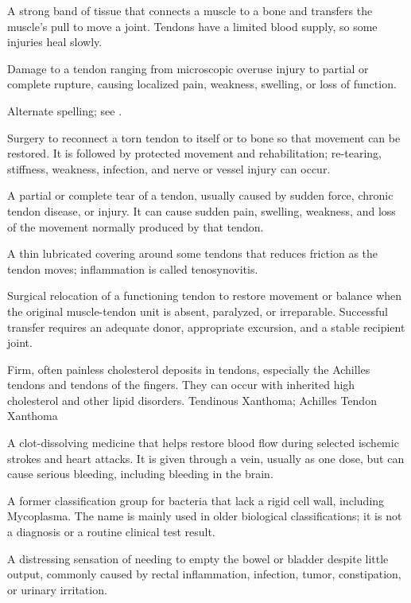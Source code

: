  A strong band of tissue that connects a muscle to a bone and transfers the muscle’s pull to move a joint. Tendons have a limited blood supply, so some injuries heal slowly.

 Damage to a tendon ranging from microscopic overuse injury to partial or complete rupture, causing localized pain, weakness, swelling, or loss of function.

 Alternate spelling; see .

 Surgery to reconnect a torn tendon to itself or to bone so that movement can be restored. It is followed by protected movement and rehabilitation; re-tearing, stiffness, weakness, infection, and nerve or vessel injury can occur.

 A partial or complete tear of a tendon, usually caused by sudden force, chronic tendon disease, or injury. It can cause sudden pain, swelling, weakness, and loss of the movement normally produced by that tendon.

 A thin lubricated covering around some tendons that reduces friction as the tendon moves; inflammation is called tenosynovitis.

 Surgical relocation of a functioning tendon to restore movement or balance when the
original muscle-tendon unit is absent, paralyzed, or irreparable. Successful transfer
requires an adequate donor, appropriate excursion, and a stable recipient joint.

 Firm, often painless cholesterol deposits in tendons, especially the Achilles tendons and tendons of the fingers. They can occur with inherited high cholesterol and other lipid disorders.
\synonyms
Tendinous Xanthoma; Achilles Tendon Xanthoma

 A clot-dissolving medicine that helps restore blood flow during selected ischemic strokes and heart attacks. It is given through a vein, usually as one dose, but can cause serious bleeding, including bleeding in the brain.

 A former classification group for bacteria that lack a rigid cell wall, including Mycoplasma. The name is mainly used in older biological classifications; it is not a diagnosis or a routine clinical test result.

 A distressing sensation of needing to empty the bowel or bladder despite little output, commonly caused by rectal inflammation, infection, tumor, constipation, or urinary irritation.


